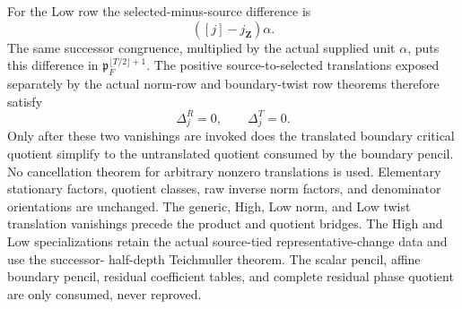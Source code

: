 \begin{theorem}
For the Low row the selected-minus-source difference is
\[
 ([j]-j_{\mathbf Z})\alpha.
\]
The same successor congruence, multiplied by the actual supplied unit
$\alpha$, puts this difference in
$\mathfrak p_F^{\lfloor T/2\rfloor+1}$.  The positive source-to-selected
translations exposed separately by the actual norm-row and boundary-twist
row theorems therefore satisfy
\[
 \Delta_j^R=0,\qquad \Delta_j^T=0.
\]
Only after these two vanishings are invoked does the translated boundary
critical quotient simplify to the untranslated quotient consumed by the
boundary pencil.  No cancellation theorem for arbitrary nonzero
translations is used.  Elementary stationary factors, quotient classes,
raw inverse norm factors, and denominator orientations are unchanged.
\leanok
{}
\FormalizationContract
The generic, High, Low norm, and Low twist translation vanishings precede
the product and quotient bridges.  The High and Low specializations retain
the actual source-tied representative-change data and use the successor-
half-depth Teichmuller theorem.  The scalar pencil, affine boundary pencil,
residual coefficient tables, and complete residual phase quotient are only
consumed, never reproved.
\end{theorem}

